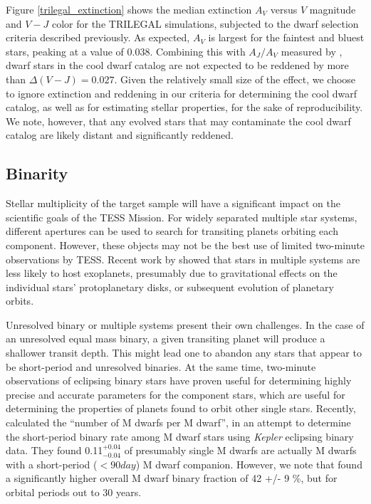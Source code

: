 \documentclass[twocolumn]{aastex62}
\begin{document}
Figure \ref{trilegal_extinction} shows the median extinction $A_V$ versus $V$ magnitude and $V-J$ color for the TRILEGAL simulations, subjected to the dwarf selection criteria described previously.  As expected, $A_V$ is largest for the faintest and bluest stars, peaking at a value of 0.038.  Combining this with $A_J/A_V$ measured by \citet{Rieke1985}, dwarf stars in the cool dwarf catalog are not expected to be reddened by more than $\Delta(V-J)=0.027$.  Given the relatively small size of the effect, we choose to ignore extinction and reddening in our criteria for determining the cool dwarf catalog, as well as for estimating stellar properties, for the sake of reproducibility.  We note, however, that any evolved stars that may contaminate the cool dwarf catalog are likely distant and significantly reddened.

\subsection{Binarity}

Stellar multiplicity of the target sample will have a significant impact on the scientific goals of the TESS Mission.  For widely separated multiple star systems, different apertures can be used to search for transiting planets orbiting each component. However, these objects may not be the best use of limited two-minute observations by TESS.  Recent work by \citet[][]{Kraus2016} showed that stars in multiple systems are less likely to host exoplanets, presumably due to gravitational effects on the individual stars' protoplanetary disks, or subsequent evolution of planetary orbits.  

Unresolved binary or multiple systems present their own challenges.  In the case of an unresolved equal mass binary, a given transiting planet will produce a shallower transit depth.  This might lead one to abandon any stars that appear to be short-period and unresolved binaries.  At the same time, two-minute observations of eclipsing binary stars have proven useful for determining highly precise and accurate parameters for the component stars, which are useful for determining the properties of planets found to orbit other single stars.  Recently, \citet[][]{Shan2015} calculated the ``number of M dwarfs per M dwarf'', in an attempt to determine the short-period binary rate among M dwarf stars using {\it Kepler} eclipsing binary data. They found 0.11$^{+0.04}_{-0.04}$ of presumably single M dwarfs are actually M dwarfs with a  short-period ($<90 day$) M dwarf companion. However, we note that \citet{Fischer1992} found a significantly higher overall M dwarf binary fraction of 42 +/- 9 \%, but for orbital periods out to 30 years.
\end{document}
